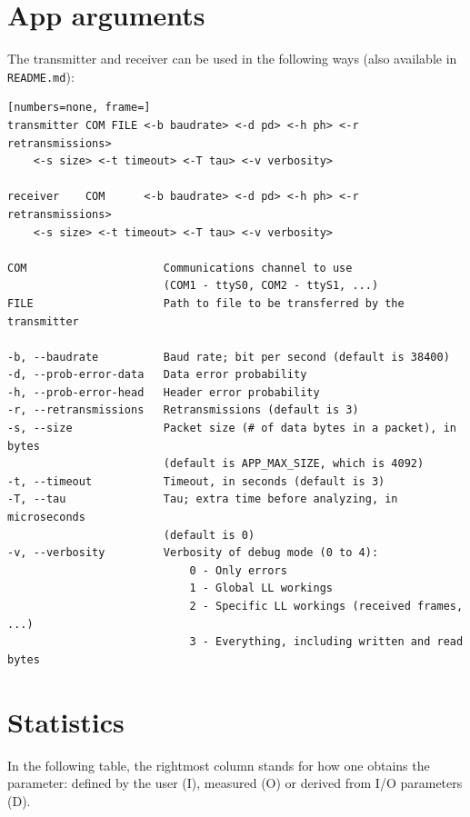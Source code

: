 \documentclass[a4paper, 11pt]{report}
\begin{document}
\chapter{App arguments} \label{ch:args}

The transmitter and receiver can be used in the following ways (also available in \texttt{README.md}):
\begin{lstlisting}[numbers=none, frame=]
transmitter COM FILE <-b baudrate> <-d pd> <-h ph> <-r retransmissions>
	<-s size> <-t timeout> <-T tau> <-v verbosity>

receiver    COM      <-b baudrate> <-d pd> <-h ph> <-r retransmissions>
	<-s size> <-t timeout> <-T tau> <-v verbosity>

COM                     Communications channel to use
						(COM1 - ttyS0, COM2 - ttyS1, ...)
FILE                    Path to file to be transferred by the transmitter

-b, --baudrate          Baud rate; bit per second (default is 38400)
-d, --prob-error-data   Data error probability
-h, --prob-error-head   Header error probability
-r, --retransmissions   Retransmissions (default is 3)
-s, --size              Packet size (# of data bytes in a packet), in bytes
						(default is APP_MAX_SIZE, which is 4092)
-t, --timeout           Timeout, in seconds (default is 3)
-T, --tau               Tau; extra time before analyzing, in microseconds
						(default is 0)
-v, --verbosity         Verbosity of debug mode (0 to 4):
							0 - Only errors
							1 - Global LL workings
							2 - Specific LL workings (received frames, ...)
							3 - Everything, including written and read bytes
\end{lstlisting}

\chapter{Statistics} \label{ch:statistics}

In the following table, the rightmost column stands for how one obtains the parameter: defined by the user (I), measured (O) or derived from I/O parameters (D).
\end{document}
